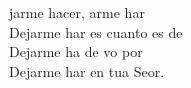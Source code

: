 \begin{cancion}%
	jarme hacer, arme har  \\
	Dejarme har es cuanto es de  \\
	Dejarme ha de vo por \\
	Dejarme har en tua Seor.\\
\end{cancion}%
